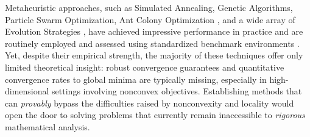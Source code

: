 \documentclass[reqno]{amsart}
\numberwithin{algorithm}{section}
\begin{document}
{Metaheuristic approaches, such as Simulated Annealing, Genetic Algorithms, Particle Swarm Optimization, Ant Colony Optimization \cite{GendPotv13,blum2003metaheuristics}, and a wide array of Evolution Strategies \cite{AugerHansen2005}, have achieved impressive performance in practice and are routinely employed and assessed using standardized benchmark environments \cite{COCO21}. Yet, despite their empirical strength, the majority of these techniques offer only limited theoretical insight: robust convergence guarantees and quantitative convergence rates to global minima are typically missing, especially in high-dimensional settings involving  nonconvex objectives. Establishing methods that can {\it provably} bypass the difficulties raised by nonconvexity and locality would open the door to solving problems that currently remain inaccessible to {\it rigorous} mathematical analysis.

}
\end{document}
